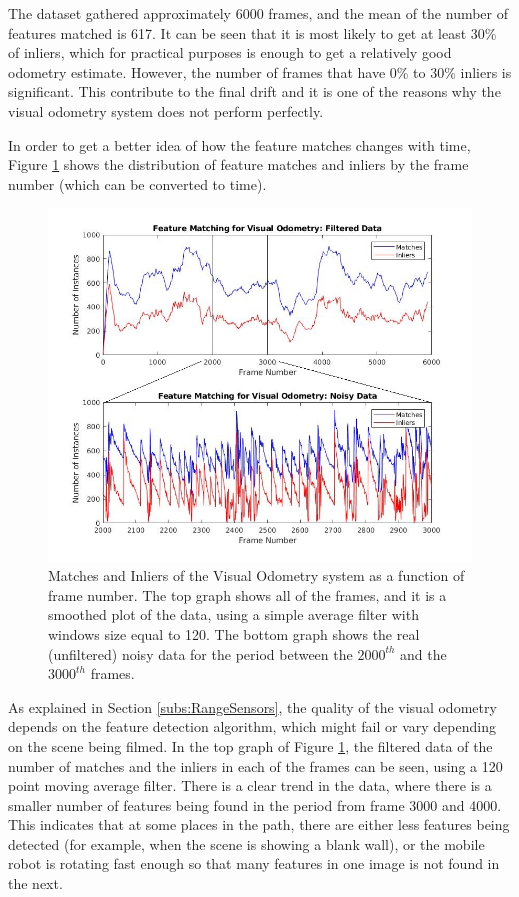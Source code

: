 \documentclass[11pt]{article}
\begin{document}
The dataset gathered approximately 6000 frames, and the mean of the number of features matched is 617. It can be seen that it is most likely to get at least 30\% of inliers, which for practical purposes is enough to get a relatively good odometry estimate. However, the number of frames that have 0\% to 30\% inliers is significant. This contribute to the final drift and it is one of the reasons why the visual odometry system does not perform perfectly.

In order to get a better idea of how the feature matches changes with time, Figure \ref{fig:InliersandOutliersVO} shows the distribution of feature matches and inliers by the frame number (which can be converted to time). 

\begin{figure}[h]
	\includegraphics[width=\linewidth]{VisualOdometry/InliertoMatches}
	\caption{Matches and Inliers of the Visual Odometry system as a function of frame number. The top graph shows all of the frames, and it is a smoothed plot of the data, using a simple average filter with windows size equal to 120.  The bottom graph shows the real (unfiltered) noisy data for the period between the $2000^{th}$ and the $3000^{th}$ frames.}
	\label{fig:InliersandOutliersVO}
\end{figure}

As explained in Section \ref{subs:RangeSensors}, the quality of the visual odometry depends on the feature detection algorithm, which might fail or vary depending on the scene being filmed. In the top graph of Figure \ref{fig:InliersandOutliersVO}, the filtered data of the number of matches and the inliers in each of the frames can be seen, using a 120 point moving average filter. There is a clear trend in the data, where there is a smaller number of features being found in the period from frame 3000 and 4000. This indicates that at some places in the path, there are either less features being detected (for example, when the scene is showing a blank wall), or the mobile robot is rotating fast enough so that many features in one image is not found in the next.
\end{document}
